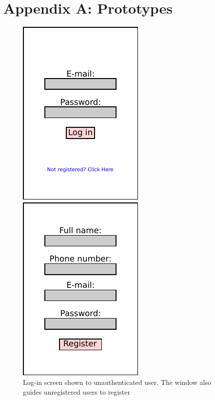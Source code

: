 \documentclass{article}
\begin{document}

\newpage
\section{Appendix A: Prototypes}
\begin{figure}[!htpb]
    \centering
    \begin{minipage}{0.25\textwidth}
        \centering
        \includegraphics[scale=1]{prdFigures/login.pdf}
        \caption{Log-in screen shown to unauthenticated user. The window also guides unregistered users to register}
        \label{fig:login}
    \end{minipage}\hfill
    \begin{minipage}{0.25\textwidth}
        \centering
        \includegraphics[scale=1]{prdFigures/register.pdf}

\end{minipage}
\end{figure}
\end{document}
